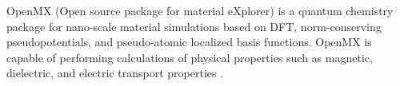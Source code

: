 OpenMX (Open source package for material eXplorer) is a quantum chemistry package for nano-scale material simulations based on DFT, norm-conserving pseudopotentials, and pseudo-atomic localized basis functions. OpenMX is capable of performing calculations of physical properties such as magnetic, dielectric, and electric transport properties \cite{Parq_2014}. 